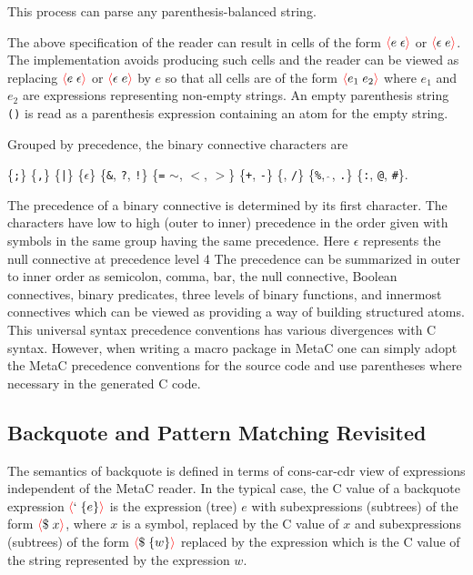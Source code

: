 \documentclass{article}
\newcommand{\mtt}[1]{\mbox{\tt #1}}
\newcommand{\fopen}{{\color{red} \langle}}
\newcommand{\fclose}{{\color{red} \rangle}}
\begin{document}
\noindent This process can parse any parenthesis-balanced string.

The above specification of the reader can result in cells of the form $\fopen e\;\epsilon \fclose$ or $\fopen \epsilon \;e\fclose$.   The implementation avoids producing such cells
and the reader can be viewed as replacing $\fopen e\;\epsilon \fclose$ or $\fopen \epsilon \;e\fclose$ by $e$ so that
all cells are of the form $\fopen e_1\;e_2\fclose$ where $e_1$ and $e_2$ are expressions representing non-empty strings.  An empty parenthesis string {\tt ()}
is read as a parenthesis expression containing an atom for the empty string.

\noindent Grouped by precedence, the binary connective characters are

\medskip
\centerline{\{\mtt{;}\} \{\mtt{,}\}  \{\mtt{|}\} \{$\epsilon$\}
  \{{\tt \&}, {\tt ?}, {\tt !}\} \{{\tt =} {\tt $\sim$}, {\tt $<$}, {\tt $>$}\} \{{\tt +}, {\tt -}\}
  \{{\tt *}, {\tt /}\} \{{\tt \%}, $\hat{~}$, {\tt .}\} \{\mtt{:},  {\tt @}, {\tt \#}\}.}

\noindent The precedence of a binary connective is determined by its first character.  The
characters have low to high (outer to inner) precedence in the order given with symbols in the same
group having the same precedence.  Here $\epsilon$ represents the null connective at precedence
level 4  The precedence can be summarized in outer to inner order as semicolon, comma, bar, the
null connective, Boolean connectives, binary predicates, three levels of binary functions, and
innermost connectives which can be viewed as providing a way of building structured atoms.  This
universal syntax precedence conventions has
various divergences with C syntax.  However, when writing a macro package in MetaC one can simply
adopt the MetaC precedence conventions for the source code and use parentheses where necessary in
the generated C code.

\subsection{Backquote and Pattern Matching Revisited}

The semantics of backquote is defined in terms of cons-car-cdr view of expressions independent of the MetaC reader.
In the typical case, the C value of a backquote expression
$\fopen ` \;\{e\}\fclose$ is the expression (tree) $e$ with subexpressions (subtrees) of the form $\fopen \$\;x \fclose$, where $x$ is a symbol,
replaced by the C value of $x$
and subexpressions (subtrees) of the form $\fopen \$\;\{w\}\fclose$ replaced by the expression which is the C value of the string represented by the expression $w$.
\end{document}
